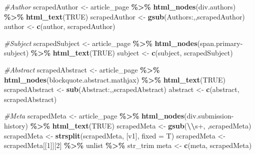 \documentclass[
]{article}
\newenvironment{Shaded}{\begin{snugshade}}{\end{snugshade}}
\newcommand{\AttributeTok}[1]{\textcolor[rgb]{0.13,0.29,0.53}{#1}}
\newcommand{\CommentTok}[1]{\textcolor[rgb]{0.56,0.35,0.01}{\textit{#1}}}
\newcommand{\ConstantTok}[1]{\textcolor[rgb]{0.56,0.35,0.01}{#1}}
\newcommand{\DecValTok}[1]{\textcolor[rgb]{0.00,0.00,0.81}{#1}}
\newcommand{\FunctionTok}[1]{\textcolor[rgb]{0.13,0.29,0.53}{\textbf{#1}}}
\newcommand{\NormalTok}[1]{#1}
\newcommand{\OtherTok}[1]{\textcolor[rgb]{0.56,0.35,0.01}{#1}}
\newcommand{\SpecialCharTok}[1]{\textcolor[rgb]{0.81,0.36,0.00}{\textbf{#1}}}
\newcommand{\StringTok}[1]{\textcolor[rgb]{0.31,0.60,0.02}{#1}}
\begin{document}
\begin{Shaded}
\begin{Highlighting}[]
    \CommentTok{\#Author}
\NormalTok{    scrapedAuthor }\OtherTok{\textless{}{-}}\NormalTok{ article\_page }\SpecialCharTok{\%\textgreater{}\%} \FunctionTok{html\_nodes}\NormalTok{(}\StringTok{\textquotesingle{}div.authors\textquotesingle{}}\NormalTok{) }\SpecialCharTok{\%\textgreater{}\%} \FunctionTok{html\_text}\NormalTok{(}\ConstantTok{TRUE}\NormalTok{)}
\NormalTok{    scrapedAuthor }\OtherTok{\textless{}{-}} \FunctionTok{gsub}\NormalTok{(}\StringTok{\textquotesingle{}Authors:\textquotesingle{}}\NormalTok{,}\StringTok{\textquotesingle{}\textquotesingle{}}\NormalTok{,scrapedAuthor)}
\NormalTok{    author }\OtherTok{\textless{}{-}} \FunctionTok{c}\NormalTok{(author, scrapedAuthor)}
    
    \CommentTok{\#Subject}
\NormalTok{    scrapedSubject }\OtherTok{\textless{}{-}}\NormalTok{ article\_page }\SpecialCharTok{\%\textgreater{}\%} \FunctionTok{html\_nodes}\NormalTok{(}\StringTok{\textquotesingle{}span.primary{-}subject\textquotesingle{}}\NormalTok{) }\SpecialCharTok{\%\textgreater{}\%} \FunctionTok{html\_text}\NormalTok{(}\ConstantTok{TRUE}\NormalTok{)}
\NormalTok{    subject }\OtherTok{\textless{}{-}} \FunctionTok{c}\NormalTok{(subject, scrapedSubject)}
    
    \CommentTok{\#Abstract}
\NormalTok{    scrapedAbstract }\OtherTok{\textless{}{-}}\NormalTok{ article\_page }\SpecialCharTok{\%\textgreater{}\%} \FunctionTok{html\_nodes}\NormalTok{(}\StringTok{\textquotesingle{}blockquote.abstract.mathjax\textquotesingle{}}\NormalTok{) }\SpecialCharTok{\%\textgreater{}\%} \FunctionTok{html\_text}\NormalTok{(}\ConstantTok{TRUE}\NormalTok{)}
\NormalTok{    scrapedAbstract }\OtherTok{\textless{}{-}} \FunctionTok{sub}\NormalTok{(}\StringTok{\textquotesingle{}Abstract:\textquotesingle{}}\NormalTok{,}\StringTok{\textquotesingle{}\textquotesingle{}}\NormalTok{,scrapedAbstract)}
\NormalTok{    abstract }\OtherTok{\textless{}{-}} \FunctionTok{c}\NormalTok{(abstract, scrapedAbstract)}
    
    \CommentTok{\#Meta}
\NormalTok{    scrapedMeta }\OtherTok{\textless{}{-}}\NormalTok{ article\_page }\SpecialCharTok{\%\textgreater{}\%} \FunctionTok{html\_nodes}\NormalTok{(}\StringTok{\textquotesingle{}div.submission{-}history\textquotesingle{}}\NormalTok{) }\SpecialCharTok{\%\textgreater{}\%} \FunctionTok{html\_text}\NormalTok{(}\ConstantTok{TRUE}\NormalTok{)}
\NormalTok{    scrapedMeta }\OtherTok{\textless{}{-}} \FunctionTok{gsub}\NormalTok{(}\StringTok{\textquotesingle{}}\SpecialCharTok{\textbackslash{}\textbackslash{}}\StringTok{s+\textquotesingle{}}\NormalTok{, }\StringTok{\textquotesingle{} \textquotesingle{}}\NormalTok{,scrapedMeta)}
\NormalTok{    scrapedMeta }\OtherTok{\textless{}{-}} \FunctionTok{strsplit}\NormalTok{(scrapedMeta, }\StringTok{\textquotesingle{}[v1]\textquotesingle{}}\NormalTok{, }\AttributeTok{fixed =}\NormalTok{ T)}
\NormalTok{    scrapedMeta }\OtherTok{\textless{}{-}}\NormalTok{ scrapedMeta[[}\DecValTok{1}\NormalTok{]][}\DecValTok{2}\NormalTok{] }\SpecialCharTok{\%\textgreater{}\%}\NormalTok{ unlist }\SpecialCharTok{\%\textgreater{}\%}\NormalTok{ str\_trim}
\NormalTok{    meta }\OtherTok{\textless{}{-}} \FunctionTok{c}\NormalTok{(meta, scrapedMeta)}
    

\end{Highlighting}
\end{Shaded}
\end{document}

